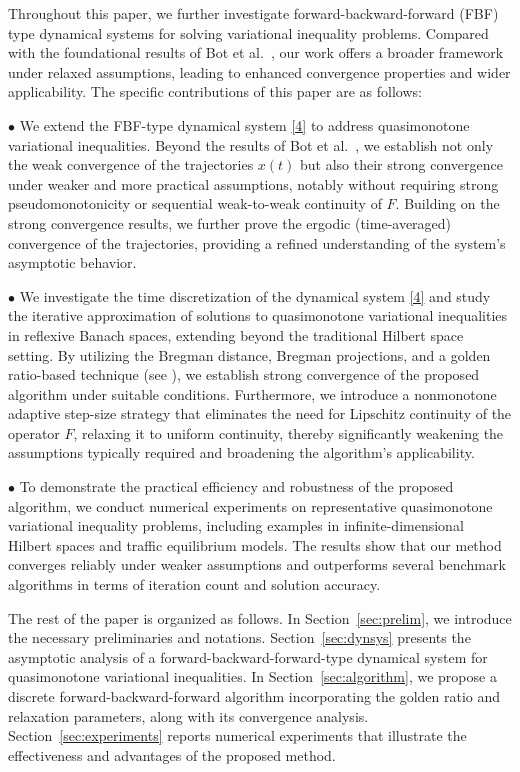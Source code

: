 \documentclass[hidelinks,11 pt]{article}
\numberwithin{equation}{section}
\theoremstyle{definition}  %
\numberwithin{equation}{section}
\numberwithin{theorem}{section}
\begin{document}
\vskip 2mm 
Throughout this paper, we further investigate forward-backward-forward (FBF) type dynamical systems for solving variational inequality problems. Compared with the foundational results of Bot et al.~\cite{a23}, our work offers a broader framework under relaxed assumptions, leading to enhanced convergence properties and wider applicability. The specific contributions of this paper are as follows:

\vskip 2mm
$\bullet$ We extend the FBF-type dynamical system \eqref{4} to address quasimonotone variational inequalities. Beyond the results of Bot et al.~\cite{a23}, we establish not only the weak convergence of the trajectories $x(t)$ but also their strong convergence under weaker and more practical assumptions, notably without requiring strong pseudomonotonicity or sequential weak-to-weak continuity of $F$. Building on the strong convergence results, we further prove the ergodic (time-averaged) convergence of the trajectories, providing a refined understanding of the system's asymptotic behavior.

\vskip 2mm
$\bullet$ We investigate the time discretization of the dynamical system \eqref{4} and study the iterative approximation of solutions to quasimonotone variational inequalities in reflexive Banach spaces, extending beyond the traditional Hilbert space setting. By utilizing the Bregman distance, Bregman projections, and a golden ratio-based technique (see \cite{a26}), we establish strong convergence of the proposed algorithm under suitable conditions. Furthermore, we introduce a nonmonotone adaptive step-size strategy that eliminates the need for Lipschitz continuity of the operator $F$, relaxing it to uniform continuity, thereby significantly weakening the assumptions typically required and broadening the algorithm's applicability.

\vskip 2mm
$\bullet$ To demonstrate the practical efficiency and robustness of the proposed algorithm, we conduct numerical experiments on representative quasimonotone variational inequality problems, including examples in infinite-dimensional Hilbert spaces and traffic equilibrium models. The results show that our method converges reliably under weaker assumptions and outperforms several benchmark algorithms in terms of iteration count and solution accuracy.

\vskip 2mm 
The rest of the paper is organized as follows. In Section~\ref{sec:prelim}, we introduce the necessary preliminaries and notations. Section~\ref{sec:dynsys} presents the asymptotic analysis of a forward-backward-forward-type dynamical system for quasimonotone variational inequalities. In Section~\ref{sec:algorithm}, we propose a discrete forward-backward-forward algorithm incorporating the golden ratio and relaxation parameters, along with its convergence analysis. Section~\ref{sec:experiments} reports numerical experiments that illustrate the effectiveness and advantages of the proposed method.
\end{document}
